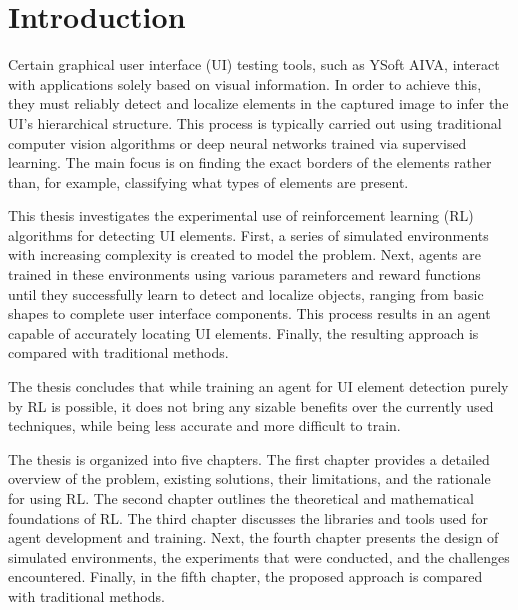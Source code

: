 \documentclass[
  digital,     %
  oneside,     %
  nosansbold,  %
  nocolorbold, %
  lof,         %
  lot,         %
]{fithesis4}
\begin{document}
\chapter*{Introduction}

Certain graphical user interface (UI) testing tools, such as YSoft AIVA, interact with applications solely based on visual information. In order to achieve this, they must reliably detect and localize elements in the captured image to infer the UI's hierarchical structure. This process is typically carried out using traditional computer vision algorithms or deep neural networks trained via supervised learning. The main focus is on finding the exact borders of the elements rather than, for example, classifying what types of elements are present.

This thesis investigates the experimental use of reinforcement learning (RL) algorithms for detecting UI elements. First, a series of simulated environments with increasing complexity is created to model the problem. Next, agents are trained in these environments using various parameters and reward functions until they successfully learn to detect and localize objects, ranging from basic shapes to complete user interface components. This process results in an agent capable of accurately locating UI elements. Finally, the resulting approach is compared with traditional methods.

The thesis concludes that while training an agent for UI element detection purely by RL is possible, it does not bring any sizable benefits over the currently used techniques, while being less accurate and more difficult to train.

The thesis is organized into five chapters. The first chapter provides a detailed overview of the problem, existing solutions, their limitations, and the rationale for using RL. The second chapter outlines the theoretical and mathematical foundations of RL. The third chapter discusses the libraries and tools used for agent development and training. Next, the fourth chapter presents the design of simulated environments, the experiments that were conducted, and the challenges encountered. Finally, in the fifth chapter, the proposed approach is compared with traditional methods.
\end{document}
